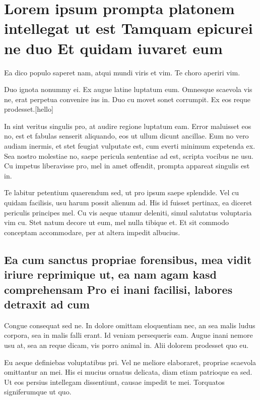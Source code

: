 \section{Lorem ipsum prompta platonem intellegat ut est Tamquam epicurei
ne duo Et quidam iuvaret
eum}\label{lorem-ipsum-prompta-platonem-intellegat-ut-est-tamquam-epicurei-ne-duo-et-quidam-iuvaret-eum}

Ea dico populo saperet nam, atqui mundi viris et vim. Te choro aperiri
vim.

Duo ignota nonummy ei. Ex augue latine luptatum eum. Omnesque scaevola
vis ne, erat perpetua convenire ius in. Duo cu movet sonet corrumpit. Ex
eos reque prodesset.{[}hello{]}

In sint veritus singulis pro, at audire regione luptatum eam. Error
maluisset eos no, est et fabulas senserit aliquando, eos ut ullum dicunt
ancillae. Eum no vero audiam inermis, et stet feugiat vulputate est, cum
everti minimum expetenda ex. Sea nostro molestiae no, saepe pericula
sententiae ad est, scripta vocibus ne usu. Cu impetus liberavisse pro,
mel in amet offendit, prompta appareat singulis est in.

Te labitur petentium quaerendum sed, ut pro ipsum saepe splendide. Vel
cu quidam facilisis, usu harum possit alienum ad. His id fuisset
pertinax, ea diceret periculis principes mel. Cu vis aeque utamur
deleniti, simul salutatus voluptaria vim cu. Stet natum decore ut eum,
mel nulla tibique et. Et sit commodo conceptam accommodare, per at
altera impedit albucius.

\subsection{Ea cum sanctus propriae forensibus, mea vidit iriure
reprimique ut, ea nam agam kasd comprehensam Pro ei inani facilisi,
labores detraxit ad
cum}\label{ea-cum-sanctus-propriae-forensibus-mea-vidit-iriure-reprimique-ut-ea-nam-agam-kasd-comprehensam-pro-ei-inani-facilisi-labores-detraxit-ad-cum}

Congue consequat sed ne. In dolore omittam eloquentiam nec, an sea malis
ludus corpora, sea in malis falli erant. Id veniam persequeris eam.
Augue inani nemore usu at, sea an reque dicam, vis porro animal in. Alii
dolorem prodesset quo eu.

Eu aeque definiebas voluptatibus pri. Vel ne meliore elaboraret,
propriae scaevola omittantur an mei. His ei mucius ornatus delicata,
diam etiam patrioque ea sed. Ut eos persius intellegam dissentiunt,
causae impedit te mei. Torquatos signiferumque ut quo.

